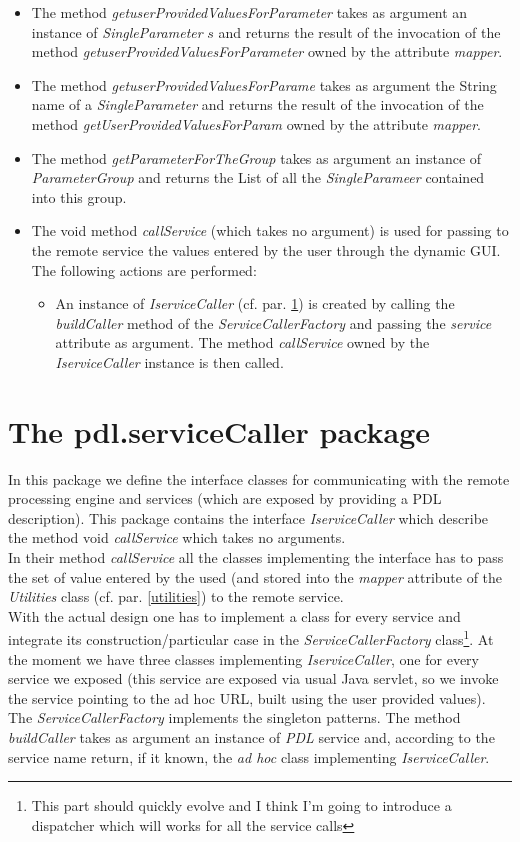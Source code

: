 \documentclass[a4paper,11pt] {ivoa}
\begin{document}
\begin{itemize}
\begin{itemize}
\item The method {\it getuserProvidedValuesForParameter} takes as argument an instance of {\it SingleParameter} $s$ and returns the result of the invocation of the method {\it getuserProvidedValuesForParameter} owned by the attribute {\it mapper}.
\item The method {\it getuserProvidedValuesForParame} takes as argument the String name of a {\it SingleParameter} and returns the result of the invocation of the method {\it getUserProvidedValuesForParam} owned by the attribute {\it mapper}.
\item The method {\it getParameterForTheGroup} takes as argument an instance of {\it ParameterGroup} and returns the List of all the {\it SingleParameer} contained into this group.
\item The void method {\it callService} (which takes no argument) is used for passing to the remote service the values entered by the user through the dynamic GUI. The following actions are performed:
\begin{itemize}
\item An instance of {\it IserviceCaller} (cf. par. \ref{serviceCaller}) is created by calling the {\it buildCaller} method of the  {\it ServiceCallerFactory} and passing the {\it service} attribute as argument. The method {\it callService} owned by the {\it IserviceCaller} instance is then called.
\end{itemize}
\end{itemize}
\end{itemize}

\section{ The pdl.serviceCaller package}\label{serviceCaller}
In this package we define the interface classes for communicating with the remote processing engine and services (which are exposed by providing a PDL description). This package contains the interface {\it IserviceCaller} which describe  the method void {\it callService} which takes no arguments.\\
In their method {\it callService} all the classes implementing the interface has to pass the set of value entered by the used (and stored into the {\it mapper} attribute of the {\it Utilities} class (cf. par. \ref{utilities}) to the remote service.\\
With the actual design one has to implement a class for every service and integrate its construction/particular case in the {\it ServiceCallerFactory} class\footnote{This part should quickly evolve and I think I'm going to introduce a dispatcher which will works for all the service calls}. At the moment we have three classes implementing {\it IserviceCaller}, one for every service we exposed (this service are exposed via usual Java servlet, so we invoke the service pointing to the ad hoc URL, built using the user provided values).\\

\noindent The {\it ServiceCallerFactory} implements the singleton patterns. The method {\it buildCaller} takes as argument an instance of {\it PDL} service and, according to the service name return, if it known, the {\it ad hoc} class implementing {\it IserviceCaller}.
\end{document}
